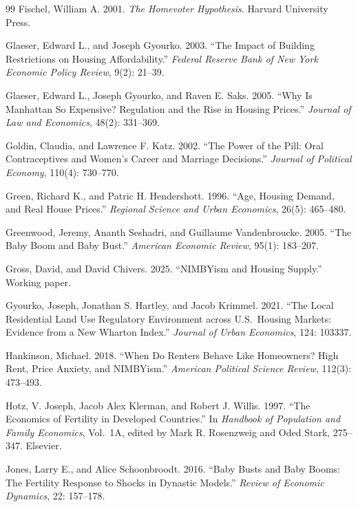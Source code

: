 \documentclass[11pt]{article}
\begin{document}
\begin{thebibliography}{99}
 Fischel, William A. 2001. \textit{The Homevoter Hypothesis}. Harvard University Press.

 Glaeser, Edward L., and Joseph Gyourko. 2003. ``The Impact of Building Restrictions on Housing Affordability.'' \textit{Federal Reserve Bank of New York Economic Policy Review}, 9(2): 21--39.

 Glaeser, Edward L., Joseph Gyourko, and Raven E. Saks. 2005. ``Why Is Manhattan So Expensive? Regulation and the Rise in Housing Prices.'' \textit{Journal of Law and Economics}, 48(2): 331--369.

 Goldin, Claudia, and Lawrence F. Katz. 2002. ``The Power of the Pill: Oral Contraceptives and Women's Career and Marriage Decisions.'' \textit{Journal of Political Economy}, 110(4): 730--770.

 Green, Richard K., and Patric H. Hendershott. 1996. ``Age, Housing Demand, and Real House Prices.'' \textit{Regional Science and Urban Economics}, 26(5): 465--480.

 Greenwood, Jeremy, Ananth Seshadri, and Guillaume Vandenbroucke. 2005. ``The Baby Boom and Baby Bust.'' \textit{American Economic Review}, 95(1): 183--207.

 Gross, David, and David Chivers. 2025. ``NIMBYism and Housing Supply.'' Working paper.

 Gyourko, Joseph, Jonathan S. Hartley, and Jacob Krimmel. 2021. ``The Local Residential Land Use Regulatory Environment across U.S.\ Housing Markets: Evidence from a New Wharton Index.'' \textit{Journal of Urban Economics}, 124: 103337.

 Hankinson, Michael. 2018. ``When Do Renters Behave Like Homeowners? High Rent, Price Anxiety, and NIMBYism.'' \textit{American Political Science Review}, 112(3): 473--493.

 Hotz, V. Joseph, Jacob Alex Klerman, and Robert J. Willis. 1997. ``The Economics of Fertility in Developed Countries.'' In \textit{Handbook of Population and Family Economics}, Vol.~1A, edited by Mark R. Rosenzweig and Oded Stark, 275--347. Elsevier.

 Jones, Larry E., and Alice Schoonbroodt. 2016. ``Baby Busts and Baby Booms: The Fertility Response to Shocks in Dynastic Models.'' \textit{Review of Economic Dynamics}, 22: 157--178.


\end{thebibliography}
\end{document}
